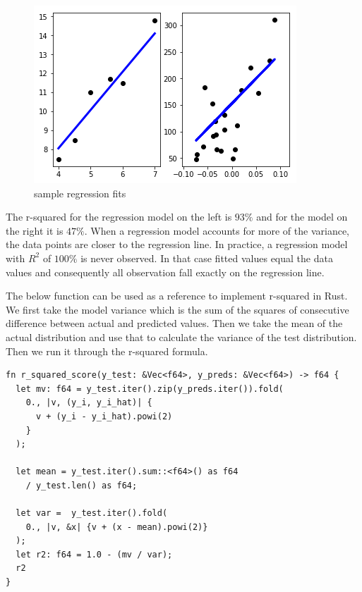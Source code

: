 \documentclass{book}
\begin{document}
\begin{figure}[htpb]
	\centering
	\includegraphics[height=0.3\textheight,width=0.8\linewidth]{r-squared-comparison.png}
	\caption{sample regression fits}
	\label{fig:sample regression fits}
\end{figure}

The r-squared for the regression model on the left is $93\%$ and for the model on the right it is $47\%$. When a regression model accounts for more of the variance, the data points are closer to the regression line. In practice, a regression model with $R^2$ of $100\%$ is never observed. In that case fitted values equal the data values and consequently all observation fall exactly on the regression line.

The below function can be used as a reference to implement r-squared in Rust. We first take the model variance which is the sum of the squares of consecutive difference between actual and predicted values. Then we take the mean of the actual distribution and use that to calculate the variance of the test distribution. Then we run it through the r-squared formula.

\begin{lstlisting}[caption={ml\\-utils\\/src\\/sup\_metrics\\.rs}]
fn r_squared_score(y_test: &Vec<f64>, y_preds: &Vec<f64>) -> f64 {
  let mv: f64 = y_test.iter().zip(y_preds.iter()).fold(
    0., |v, (y_i, y_i_hat)| {
      v + (y_i - y_i_hat).powi(2)
    }
  );

  let mean = y_test.iter().sum::<f64>() as f64
    / y_test.len() as f64;

  let var =  y_test.iter().fold(
    0., |v, &x| {v + (x - mean).powi(2)}
  );
  let r2: f64 = 1.0 - (mv / var);
  r2
}
\end{lstlisting}
\end{document}
